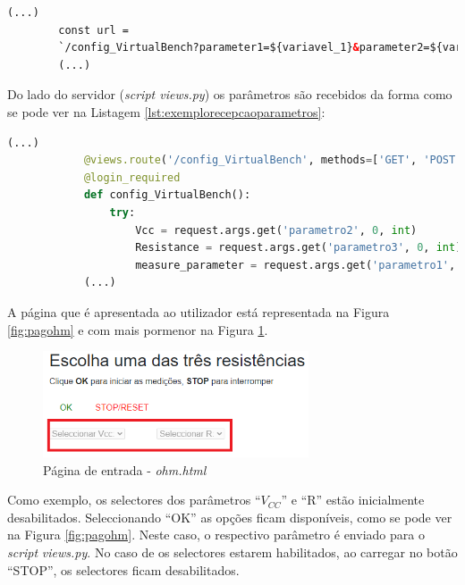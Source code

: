 \begin{center}
	\begin{minipage}{0.7\linewidth}
		\begin{lstlisting}[language=Html, caption=Exemplo de envio de parâmetros da página \textit{ohm.html} para o \textit{script views.py}, label=lst:exemploenvioparametros]
		(...)
		const url = 
		`/config_VirtualBench?parameter1=${variavel_1}&parameter2=${variavel2}&parameter3=${variavel3}`
		(...)
	\end{lstlisting}
	\end{minipage}
\end{center}

Do lado do servidor (\textit{script views.py}) os parâmetros são recebidos da forma como se pode ver na Listagem \ref{lst:exemplorecepcaoparametros}:
\begin{center}
	\begin{minipage}{1\linewidth}
		\begin{lstlisting}[language=Python, caption=Exemplo da recepção dos parâmetros no \textit{script views.py} enviados da página \textit{ohm.html}, label=lst:exemplorecepcaoparametros]
			(...)
			@views.route('/config_VirtualBench', methods=['GET', 'POST'])
			@login_required
			def config_VirtualBench():
				try:
					Vcc = request.args.get('parametro2', 0, int)
					Resistance = request.args.get('parametro3', 0, int)
					measure_parameter = request.args.get('parametro1', 0, str)
			(...)
		\end{lstlisting}
	\end{minipage}
\end{center}

A página que é apresentada ao utilizador está representada na Figura \ref{fig:pagohm} e com mais pormenor na Figura \ref{fig:introohm}.
\begin{figure}[hbtp]
	\centering
	\includegraphics[width=0.7\textwidth]{figures/parametros_desabilitados.png}
	\caption{Página de entrada - \textit{ohm.html}}
	\label{fig:introohm}
\end{figure}

Como exemplo, os selectores dos parâmetros ``$V_{CC}$'' e ``R'' estão inicialmente desabilitados. Seleccionando ``OK'' as opções ficam disponíveis, como se pode ver na Figura \ref{fig:pagohm}. Neste caso, o respectivo parâmetro é enviado para o \textit{script} \textit{views.py}. No caso de os selectores estarem habilitados, ao carregar no botão ``STOP'', os selectores ficam desabilitados.

